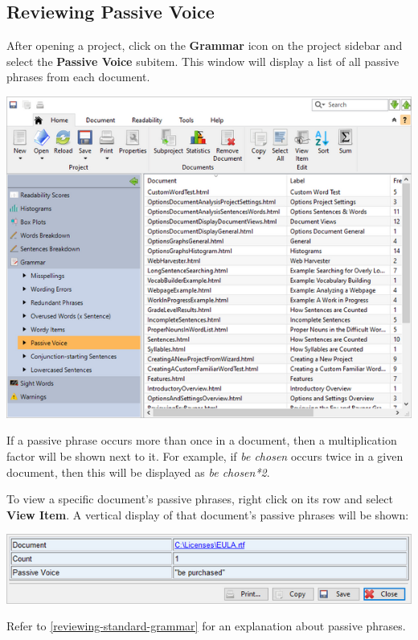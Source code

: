 \documentclass[
]{book}
\theoremstyle{definition}
\theoremstyle{definition}
\theoremstyle{definition}
\theoremstyle{definition}
\theoremstyle{remark}
\begin{document}
\hypertarget{reviewing-batch-passive-voices}{%
\subsection*{Reviewing Passive Voice}\label{reviewing-batch-passive-voices}}

After opening a project, click on the \textbf{Grammar} icon on the project sidebar and select the \textbf{Passive Voice} subitem. This window will display a list of all passive phrases from each document.

\includegraphics{Images/batchpassivevoice.png}

If a passive phrase occurs more than once in a document, then a multiplication factor will be shown next to it. For example, if \emph{be chosen} occurs twice in a given document, then this will be displayed as \emph{be chosen*2}.

To view a specific document's passive phrases, right click on its row and select \textbf{View Item}. A vertical display of that document's passive phrases will be shown:

\includegraphics{Images/batchpassivevoiceviewitem.png}

Refer to \ref{reviewing-standard-grammar} for an explanation about passive phrases.
\end{document}
